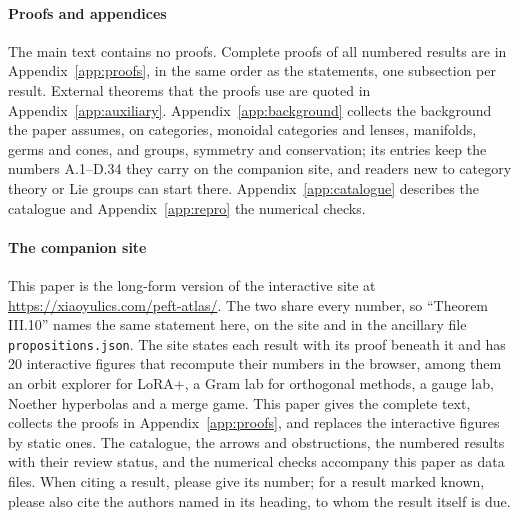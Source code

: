 \paragraph{Proofs and appendices}
The main text contains no proofs. Complete proofs of all numbered results are in Appendix~\ref{app:proofs}, in the same order as the statements, one subsection per result. External theorems that the proofs use are quoted in Appendix~\ref{app:auxiliary}. Appendix~\ref{app:background} collects the background the paper assumes, on categories, monoidal categories and lenses, manifolds, germs and cones, and groups, symmetry and conservation; its entries keep the numbers A.1--D.34 they carry on the companion site, and readers new to category theory or Lie groups can start there. Appendix~\ref{app:catalogue} describes the catalogue and Appendix~\ref{app:repro} the numerical checks.

\paragraph{The companion site}
This paper is the long-form version of the interactive site at \url{https://xiaoyulics.com/peft-atlas/}. The two share every number, so ``Theorem III.10'' names the same statement here, on the site and in the ancillary file \texttt{propositions.json}. The site states each result with its proof beneath it and has 20 interactive figures that recompute their numbers in the browser, among them an orbit explorer for LoRA+, a Gram lab for orthogonal methods, a gauge lab, Noether hyperbolas and a merge game. This paper gives the complete text, collects the proofs in Appendix~\ref{app:proofs}, and replaces the interactive figures by static ones. The catalogue, the arrows and obstructions, the numbered results with their review status, and the numerical checks accompany this paper as data files. When citing a result, please give its number; for a result marked known, please also cite the authors named in its heading, to whom the result itself is due.
